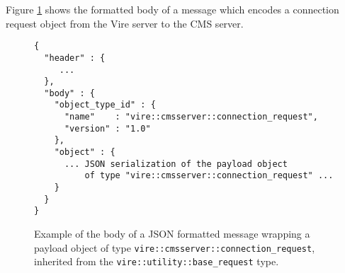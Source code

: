 Figure \ref{fig-app-json-body-1} shows the formatted body of a
message which encodes a connection request object from the Vire server
to the CMS server.

\begin{figure}[h]
\vskip 10pt
\small
\begin{Verbatim}[frame=single,xleftmargin=0.cm,label=\fbox{\texttt{JSON}}]
{
  "header" : {
     ...
  },
  "body" : {
    "object_type_id" : {
      "name"    : "vire::cmsserver::connection_request",
      "version" : "1.0"
    },
    "object" : {
      ... JSON serialization of the payload object
          of type "vire::cmsserver::connection_request" ...
    }
  }
}
\end{Verbatim}
\normalsize
\caption{Example of  the body of  a JSON formatted message  wrapping a
  payload                object                 of                type
  \texttt{vire::cmsserver::connection\_request},  inherited  from  the
  \texttt{vire::utility::base\_request} type.}
  \label{fig-app-json-body-1}
\end{figure}

\vfill
\pagebreak
\clearpage
